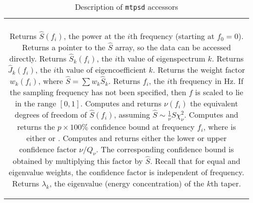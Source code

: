\begin{table}
    \caption{ Description of \texttt{mtpsd} accessors \label{tbl:mtpsdaccess} }
    \vspace*{-0.75em}
    
    \begin{tabular}{c}
        \hline\hline\\[-0.75em]
        \small
        \parbox{\textwidth-12pt}{
            \vspace*{-0.5em}
            \begin{compactcodelist}
                    Returns $\hat{S}(f_i)$, the power at the $i$th frequency (starting at $f_0=0$).
                    Returns a pointer to the $\hat{S}$ array, so the data can be accessed directly.
                    Returns $\hat{S}_k(f_i)$, the $i$th value of eigenspectrum $k$. 
                    Returns $\hat{J}_k(f_i)$, the $i$th value of eigencoefficient $k$.
                    Returns the weight factor $w_k(f_i)$, where $\hat{S}=\sum w_k\hat{S}_k$.
                    Returns $f_i$, the $i$th frequency in Hz.  If the sampling frequency has not been specified, then $f$ is scaled to lie in the range $[0, 1]$.
                    Computes and returns $\nu(f_i)$ the equivalent degrees of freedom of $\hat{S}(f_i)$, assuming $\hat{S}\sim \frac{1}{\nu}S\chi^2_\nu$.
                    Computes and returns the $p\times100\%$ confidence bound at frequency $f_i$, where  is either  or .
                    Computes and returns either the lower or upper confidence factor $\nu/Q_\nu$.  The corresponding confidence bound is obtained by multiplying this factor by $\hat{S}$. Recall that for equal and eigenvalue weights, the confidence factor is independent of frequency.  
                    Returns $\lambda_k$, the eigenvalue (energy concentration) of the $k$th taper.

\end{compactcodelist}}
\end{tabular}
\end{table}
